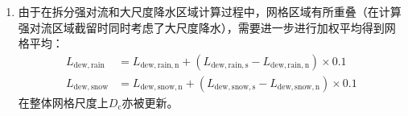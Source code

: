 \begin{enumerate}
  \item 由于在拆分强对流和大尺度降水区域计算过程中，网格区域有所重叠（在计算强对流区域截留时同时考虑了大尺度降水），需要进一步进行加权平均得到网格平均：
%
    \begin{equation}
      \begin{aligned}
        L_{\mathrm{dew,rain}} & = L_{\mathrm{dew,rain,n}} + (L_{\mathrm{dew,rain,s}} - L_{\mathrm{dew,rain,n}}) \times 0.1 \\
        L_{\mathrm{dew,snow}} & = L_{\mathrm{dew,snow,n}} + (L_{\mathrm{dew,snow,s}} - L_{\mathrm{dew,snow,n}}) \times 0.1
%
      \end{aligned}
    \end{equation}
%
    在整体网格尺度上$D_{\mathrm {c}} $亦被更新。

\end{enumerate}

